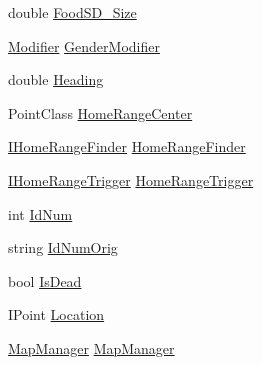 \begin{DoxyCompactItemize}
double \hyperlink{class_s_e_a_r_c_h_1_1_animal_a0db89938a765aecd96e7f1d49aea6275}{Food\-S\-D\-\_\-\-Size}
\item 
\hyperlink{class_s_e_a_r_c_h_1_1_modifier}{Modifier} \hyperlink{class_s_e_a_r_c_h_1_1_animal_aa114945a8096c6feec40c90132358373}{Gender\-Modifier}
\item 
double \hyperlink{class_s_e_a_r_c_h_1_1_animal_ae97dc3434cb371a6afb6c2a4a66e998d}{Heading}
\item 
Point\-Class \hyperlink{class_s_e_a_r_c_h_1_1_animal_a7f9bb5c7812e09103dd2ba1c544dc114}{Home\-Range\-Center}
\item 
\hyperlink{interface_s_e_a_r_c_h_1_1_i_home_range_finder}{I\-Home\-Range\-Finder} \hyperlink{class_s_e_a_r_c_h_1_1_animal_af05446c781b60b5ecdc6fbd8d2d6508e}{Home\-Range\-Finder}
\item 
\hyperlink{interface_s_e_a_r_c_h_1_1_i_home_range_trigger}{I\-Home\-Range\-Trigger} \hyperlink{class_s_e_a_r_c_h_1_1_animal_a11b0de2921f92d8fb4403c93321af158}{Home\-Range\-Trigger}
\item 
int \hyperlink{class_s_e_a_r_c_h_1_1_animal_a71dc133a0902b560035c839eeab5aa5b}{Id\-Num}
\item 
string \hyperlink{class_s_e_a_r_c_h_1_1_animal_afdb0155688bedee6cdea89a2ba9e416e}{Id\-Num\-Orig}
\item 
bool \hyperlink{class_s_e_a_r_c_h_1_1_animal_a8560c12df05cfb9fd9552c2a6d6406d9}{Is\-Dead}
\item 
I\-Point \hyperlink{class_s_e_a_r_c_h_1_1_animal_a268ceccff11bb7e97748f6fcc6f47850}{Location}
\item 
\hyperlink{class_s_e_a_r_c_h_1_1_map_manager}{Map\-Manager} \hyperlink{class_s_e_a_r_c_h_1_1_animal_a7de0ff0d59e4f1a90e9bc78a8cfd1dd4}{Map\-Manager}

\end{DoxyCompactItemize}
